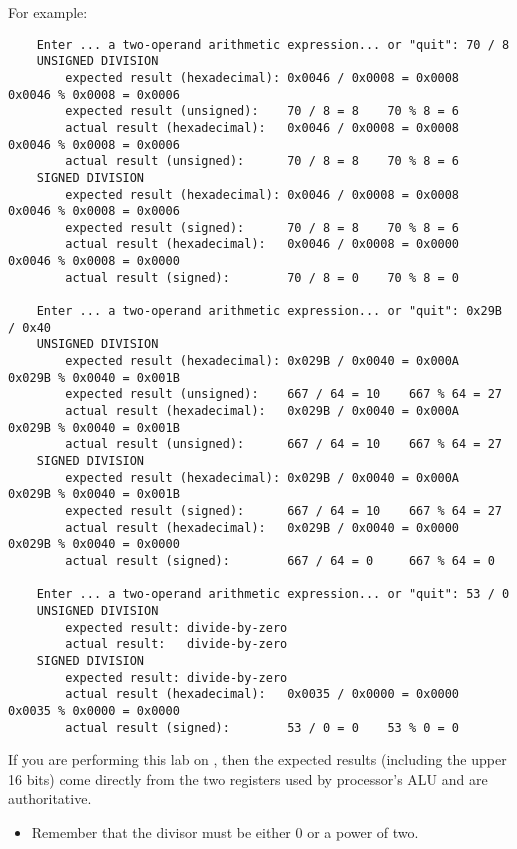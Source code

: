 For example:
\begin{small}\begin{verbatim}
    Enter ... a two-operand arithmetic expression... or "quit": 70 / 8
    UNSIGNED DIVISION
        expected result (hexadecimal): 0x0046 / 0x0008 = 0x0008    0x0046 % 0x0008 = 0x0006
        expected result (unsigned):    70 / 8 = 8    70 % 8 = 6
        actual result (hexadecimal):   0x0046 / 0x0008 = 0x0008    0x0046 % 0x0008 = 0x0006
        actual result (unsigned):      70 / 8 = 8    70 % 8 = 6
    SIGNED DIVISION
        expected result (hexadecimal): 0x0046 / 0x0008 = 0x0008    0x0046 % 0x0008 = 0x0006
        expected result (signed):      70 / 8 = 8    70 % 8 = 6
        actual result (hexadecimal):   0x0046 / 0x0008 = 0x0000    0x0046 % 0x0008 = 0x0000
        actual result (signed):        70 / 8 = 0    70 % 8 = 0

    Enter ... a two-operand arithmetic expression... or "quit": 0x29B / 0x40
    UNSIGNED DIVISION
        expected result (hexadecimal): 0x029B / 0x0040 = 0x000A    0x029B % 0x0040 = 0x001B
        expected result (unsigned):    667 / 64 = 10    667 % 64 = 27
        actual result (hexadecimal):   0x029B / 0x0040 = 0x000A    0x029B % 0x0040 = 0x001B
        actual result (unsigned):      667 / 64 = 10    667 % 64 = 27
    SIGNED DIVISION
        expected result (hexadecimal): 0x029B / 0x0040 = 0x000A    0x029B % 0x0040 = 0x001B
        expected result (signed):      667 / 64 = 10    667 % 64 = 27
        actual result (hexadecimal):   0x029B / 0x0040 = 0x0000    0x029B % 0x0040 = 0x0000
        actual result (signed):        667 / 64 = 0     667 % 64 = 0

    Enter ... a two-operand arithmetic expression... or "quit": 53 / 0
    UNSIGNED DIVISION
        expected result: divide-by-zero
        actual result:   divide-by-zero
    SIGNED DIVISION
        expected result: divide-by-zero
        actual result (hexadecimal):   0x0035 / 0x0000 = 0x0000    0x0035 % 0x0000 = 0x0000
        actual result (signed):        53 / 0 = 0    53 % 0 = 0
\end{verbatim}\end{small}

If you are performing this lab on \runtimeenvironment, then the expected results (including the upper 16 bits) come directly from the two registers used by processor's ALU and are authoritative.

\begin{description}
    \begin{itemize}
        \item Remember that the divisor must be either 0 or a power of two.
    \end{itemize}
\end{description}
